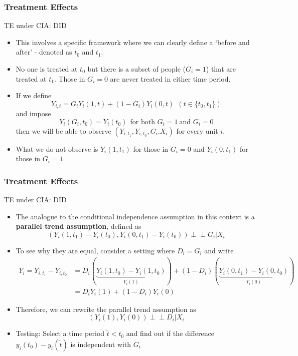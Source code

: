 \documentclass{beamer}
\begin{document}
\begin{frame}
\frametitle{Treatment Effects}
TE under CIA: DID
\begin{itemize}
\item This involves a specific framework where we can clearly define a `before and after' - denoted as $t_0$ and $t_1$. 
\item No one is treated at $t_0$ but there is a subset of people ($G_i=1$) that are treated at $t_1$. Those in $G_i=0$ are never treated in either time period. 
\item If we define
\[
Y_{i,t}=G_iY_{i}(1,t)+(1-G_i)Y_{i}(0,t) \ \ (t\in\{t_0, t_1\})
\]
and impose
\[
Y_i(G_i, t_0)=Y_{i}(t_0) \ \ \text{for both }G_i=1 \ \text{and }G_i=0 
\]
then we will be able to observe $(Y_{i,t_1}, Y_{i,t_0},G_i. X_i)$ for every unit $i$. 
\item What we do not observe is $Y_i(1,t_1)$ for those in $G_i=0$ and $Y_i(0,t_1)$ for those in $G_i=1$.  
\end{itemize}
\end{frame}

\begin{frame}
\frametitle{Treatment Effects}
TE under CIA: DID
\begin{itemize}
\item The analogue to the conditional independence assumption in this context is a \textbf{parallel trend assumption}, defined as
\[
(Y_i(1,t_1)-Y_i(t_0), Y_i(0,t_1)-Y_i(t_0)) \perp\!\!\! \perp G_i|X_i
\]
\item To see why they are equal, consider a setting where $D_i=G_i$ and write
\footnotesize{\begin{align*}
Y_i = Y_{i,t_1}-Y_{i,t_0}&=D_i(\underbrace{Y_i(1,t_0)-Y_i(1,t_0)}_{Y_i(1)})+(1-D_i)(\underbrace{Y_i(0,t_1)-Y_i(0,t_0)}_{Y_i(0)})\\
&=D_iY_i(1) + (1-D_i)Y_i(0)
\end{align*}}\normalsize
\item Therefore, we can rewrite the parallel trend assumption as
\[
(Y_i(1), Y_i(0)) \perp\!\!\! \perp D_i|X_i
\]
\item Testing: Select a time period $\tilde{t}<t_0$ and find out if the difference $y_i(t_0)-y_i(\tilde{t})$ is independent with $G_i$
\end{itemize}
\end{frame}
\end{document}
